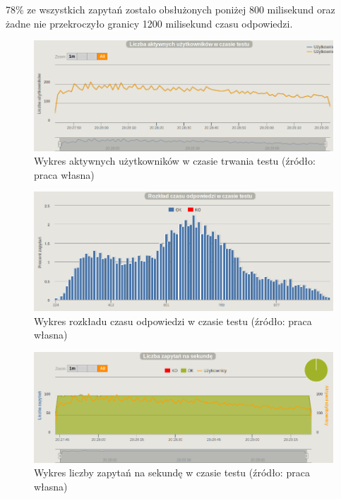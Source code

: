 \documentclass[12pt,twoside]{article}
\begin{document}
78\% ze wszystkich zapytań zostało obsłużonych poniżej 800 milisekund
oraz żadne nie przekroczyło granicy 1200 milisekund czasu odpowiedzi.

\begin{figure}[htbp]
\centering
\includegraphics[resolution=150]{test_results/js/matrix/screenshots/active_users.png}
\caption{Wykres aktywnych użytkowników w czasie trwania testu (źródło: praca własna)}
\end{figure}

\begin{figure}[htbp]
\centering
\includegraphics[resolution=150]{test_results/js/matrix/screenshots/distribution.png}
\caption{Wykres rozkładu czasu odpowiedzi w czasie testu (źródło: praca własna)}
\end{figure}

\begin{figure}[htbp]
\centering
\includegraphics[resolution=150]{test_results/js/matrix/screenshots/requests.png}
\caption{Wykres liczby zapytań na sekundę w czasie testu (źródło: praca własna)}
\end{figure}
\end{document}
